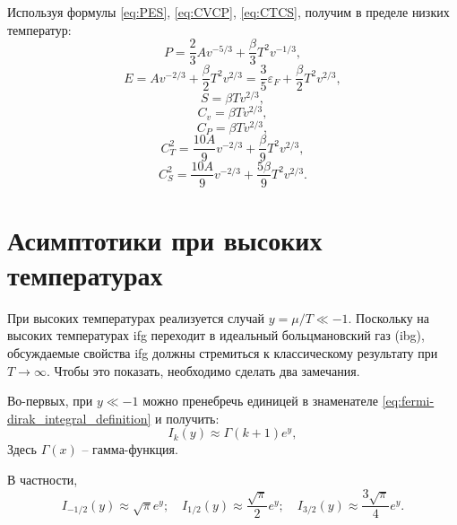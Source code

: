 Используя формулы \eqref{eq:PES}, \eqref{eq:CVCP}, \eqref{eq:CTCS}, получим в пределе низких температур:
\begin{equation}
    \label{eq:P_lt}
    P = \frac{2}{3}Av^{-5/3} + \frac{\beta}{3}T^2 v^{-1/3},
\end{equation}
\begin{equation}
    \label{eq:E_lt}
    E = Av^{-2/3} + \frac{\beta}{2}T^2 v^{2/3} = \frac{3}{5}\varepsilon_F + \frac{\beta}{2}T^2 v^{2/3},
\end{equation}
\begin{equation}
    \label{eq:S_lt}
    S = \beta T v^{2/3},
\end{equation}
\begin{equation}
    \label{eq:cv_lt}
    C_v = \beta T v^{2/3},
\end{equation}
\begin{equation}
    \label{eq:cp_lt}
    C_P = \beta T v^{2/3},
\end{equation}
\begin{equation}
    \label{eq:ct2_lt}
    C_T^2 = \frac{10A}{9}v^{-2/3} + \frac{\beta}{9}T^2 v^{2/3},
\end{equation}
\begin{equation}
    \label{eq:cs2_lt}
    C_S^2 = \frac{10A}{9}v^{-2/3} + \frac{5\beta}{9}T^2 v^{2/3}.
\end{equation}

\section{Асимптотики при высоких температурах}
\label{sec:asymp_high}
При высоких температурах реализуется случай $y = \mu / T \ll -1$.
Поскольку на высоких температурах \acrshort{ifg} переходит в идеальный больцмановский газ (\acrshort{ibg}), обсуждаемые свойства \acrshort{ifg} должны стремиться к классическому результату при $T \to \infty$.
Чтобы это показать, необходимо сделать два замечания.

Во-первых, при $y \ll -1$ можно пренебречь единицей в знаменателе \eqref{eq:fermi-dirak_integral_definition} и получить:
\begin{equation}
    \label{eq:ifg_hightemp}
    I_{k}(y)\approx \Gamma(k + 1)e^{y},
\end{equation}
Здесь $\Gamma(x)$ -- гамма-функция.

В частности,
\begin{equation*}
    I_{-1/2}(y)\approx \sqrt{\pi}e^{y};\quad I_{1/2}(y)\approx \frac{\sqrt{\pi}}{2}e^{y};\quad
    I_{3/2}(y)\approx \frac{3\sqrt{\pi}}{4}e^{y}.
\end{equation*}

